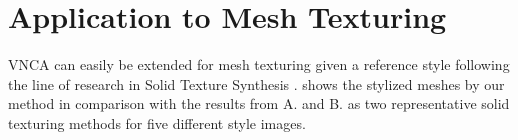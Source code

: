 \section{Application to Mesh Texturing}
\label{sec:mesh_texturing}
VNCA can easily be extended for mesh texturing given a reference style following the line of research in Solid Texture Synthesis \cite{perlin_noise, kopf2007solid, on-demand-solid-texture}.
 shows the stylized meshes by our method in comparison with the results from A. \citet{on-demand-solid-texture} and B. \citet{kopf2007solid} as two representative solid texturing methods for five different style images. 


